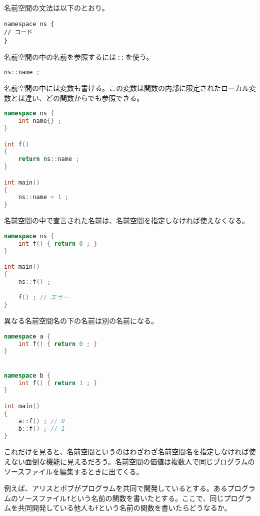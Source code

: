 \ifTombow\pagebreak\fi
名前空間の文法は以下のとおり。

\begin{lstlisting}[style=grammar]
namespace ns {
// コード
}
\end{lstlisting}

名前空間の中の名前を参照するには\,\texttt{::}\,を使う。

\begin{lstlisting}[language={C++}]
ns::name ;
\end{lstlisting}

名前空間の中には変数も書ける。この変数は関数の内部に限定されたローカル変数とは違い、どの関数からでも参照できる。

\begin{lstlisting}[language={C++}]
namespace ns {
    int name{} ;
}

int f()
{
    return ns::name ;
}

int main()
{
    ns::name = 1 ;
}
\end{lstlisting}

名前空間の中で宣言された名前は、名前空間を指定しなければ使えなくなる。

\begin{lstlisting}[language={C++}]
namespace ns {
    int f() { return 0 ; }
}

int main()
{
    ns::f() ;

    f() ; // エラー
}
\end{lstlisting}

\ifTombow\pagebreak\fi
異なる名前空間名の下の名前は別の名前になる。

\begin{lstlisting}[language={C++}]
namespace a {
    int f() { return 0 ; }
}


namespace b {
    int f() { return 1 ; }
}

int main()
{
    a::f() ; // 0
    b::f() ; // 1
}
\end{lstlisting}

これだけを見ると、名前空間というのはわざわざ名前空間名を指定しなければ使えない面倒な機能に見えるだろう。名前空間の価値は複数人で同じプログラムのソースファイルを編集するときに出てくる。

例えば、アリスとボブがプログラムを共同で開発しているとする。あるプログラムのソースファイル\texttt{f}という名前の関数を書いたとする。ここで、同じプログラムを共同開発している他人も\texttt{f}という名前の関数を書いたらどうなるか。

